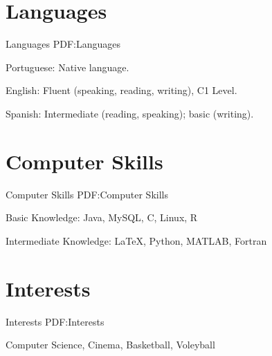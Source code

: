 \documentclass[letterpaper,10pt,oneside]{article}
\begin{document}
\begin{body}

\section
{Languages}
{Languages}
{PDF:Languages}

\BulletItem
Portuguese: Native language.

\GapNoBreak
\BulletItem
English: Fluent (speaking, reading, writing), C1 Level.

\GapNoBreak
\BulletItem
Spanish: Intermediate (reading, speaking); basic (writing).


\section
{Computer Skills}
{Computer Skills}
{PDF:Computer Skills}

\BulletItem
Basic Knowledge: Java, MySQL, C, Linux, R

\GapNoBreak
\BulletItem
Intermediate Knowledge: {\LaTeX}, Python, MATLAB, Fortran


\section
{Interests}
{Interests}
{PDF:Interests}

Computer Science, Cinema, Basketball, Voleyball
\end{body}
\label{LastPage}~
\end{document}
